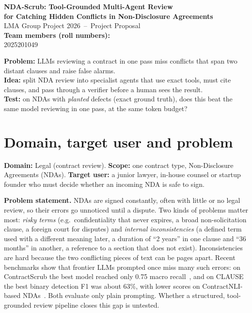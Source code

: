 \documentclass[11pt,a4paper]{article}
\begin{document}
\begin{center}
{\LARGE\bfseries\color{accent} NDA-Scrub: Tool-Grounded Multi-Agent Review\\[2pt]
for Catching Hidden Conflicts in Non-Disclosure Agreements}\\[6pt]
{\large LMA Group Project 2026 \,--\, Project Proposal}\\[3pt]
\textbf{Team members (roll numbers):}\\[1pt]
2025201049   
\end{center}

\begin{keybox}[title=Summary in three lines]
\textbf{Problem:} LLMs reviewing a contract in one pass miss conflicts that span two distant clauses and raise false alarms.\\
\textbf{Idea:} split NDA review into specialist agents that use exact tools, must cite clauses, and pass through a verifier before a human sees the result.\\
\textbf{Test:} on NDAs with \emph{planted} defects (exact ground truth), does this beat the same model reviewing in one pass, at the same token budget?
\end{keybox}

\section{Domain, target user and problem}
\textbf{Domain:} Legal (contract review). \textbf{Scope:} one contract type, Non-Disclosure Agreements (NDAs).
\textbf{Target user:} a junior lawyer, in-house counsel or startup founder who must decide whether an incoming NDA is safe to sign.

\textbf{Problem statement.}
NDAs are signed constantly, often with little or no legal review, so their errors go unnoticed until a dispute.
Two kinds of problems matter most: \emph{risky terms} (e.g.\ confidentiality that never expires, a broad
non-solicitation clause, a foreign court for disputes) and \emph{internal inconsistencies} (a defined term used with a
different meaning later, a duration of ``2 years'' in one clause and ``36 months'' in another, a reference to a section
that does not exist). Inconsistencies are hard because the two conflicting pieces of text can be pages apart.
Recent benchmarks show that frontier LLMs prompted once miss many such errors: on ContractScrub the best model reached
only 0.75 macro recall~\cite{contractscrub}, and on CLAUSE the best binary detection F1 was about 63\%, with
lower scores on ContractNLI-based NDAs~\cite{clause}. Both evaluate only plain prompting. Whether a structured,
tool-grounded review pipeline closes this gap is untested.
\end{document}
